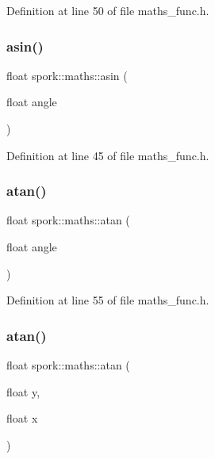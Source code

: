 Definition at line 50 of file maths\+\_\+func.\+h.

\mbox{\label{namespacespork_1_1maths_abe6dcee4251fcb68523b1dc1a7f2a0c1}} 
\subsubsection{\texorpdfstring{asin()}{asin()}}
{\footnotesize\ttfamily float spork\+::maths\+::asin (\begin{DoxyParamCaption}\item[{float}]{angle }\end{DoxyParamCaption})\hspace{0.3cm}{\ttfamily [inline]}}



Definition at line 45 of file maths\+\_\+func.\+h.

\mbox{\label{namespacespork_1_1maths_aec35004bae3eb4a768cb4fa1a52ad4d1}} 
\subsubsection{\texorpdfstring{atan()}{atan()}\hspace{0.1cm}{\footnotesize\ttfamily [1/2]}}
{\footnotesize\ttfamily float spork\+::maths\+::atan (\begin{DoxyParamCaption}\item[{float}]{angle }\end{DoxyParamCaption})\hspace{0.3cm}{\ttfamily [inline]}}



Definition at line 55 of file maths\+\_\+func.\+h.

\mbox{\label{namespacespork_1_1maths_a0e982679f0d9b9d9509069a195bb0763}} 
\subsubsection{\texorpdfstring{atan()}{atan()}\hspace{0.1cm}{\footnotesize\ttfamily [2/2]}}
{\footnotesize\ttfamily float spork\+::maths\+::atan (\begin{DoxyParamCaption}\item[{float}]{y,  }\item[{float}]{x }\end{DoxyParamCaption})\hspace{0.3cm}{\ttfamily [inline]}}



